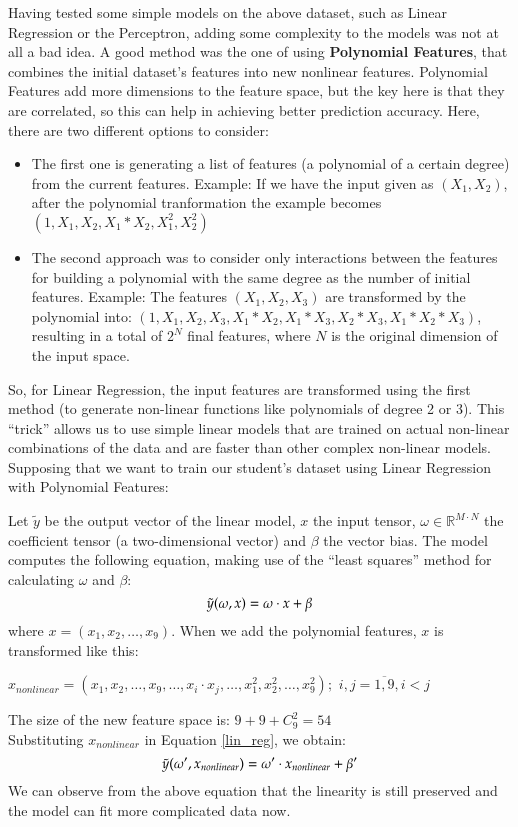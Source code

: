 Having tested some simple models on the above dataset, such as Linear Regression or the 
Perceptron, adding some complexity to the models was not at all a bad idea. 
A good method was the one of using {\bf Polynomial Features}, that combines the 
initial dataset's features into new nonlinear features. Polynomial Features add more 
dimensions to the feature space, but the key here is that they are correlated, 
so this can help in achieving better prediction accuracy. Here, there are two different 
options to consider:

\begin{itemize}
  \item The first one is generating a list of features (a polynomial of a certain 
  degree) from the current features. 
  Example: If we have the input given as $(X_1, X_2)$, after the polynomial 
  tranformation the example becomes $(1, X_1, X_2, X_1*X_2, X_1^2, X_2^2)$
  \item The second approach was to consider only interactions between the 
  features for building a polynomial with the same degree as the number of 
  initial features.
  Example: The features $(X_1, X_2, X_3)$ are transformed by the polynomial 
  into: $(1, X_1, X_2, X_3, X_1*X_2, X_1*X_3, X_2*X_3, X_1*X_2*X_3)$, resulting 
  in a total of $2^{N}$ final features, where $N$ is the original dimension of 
  the input space.
\end{itemize}

So, for Linear Regression, the input features are transformed using the first 
method (to generate non-linear functions like polynomials of degree 2 or 3).
This ``trick'' allows us to use simple linear models that are trained on actual 
non-linear combinations of the data and are faster than other complex 
non-linear models.
Supposing that we want to train our student's dataset using Linear Regression 
with Polynomial Features: 

Let $\tilde{y}$ be the output vector of the linear model, $x$ the input tensor,
$\omega \in \mathbb{R}^{M \cdot N}$ the coefficient tensor (a two-dimensional vector) 
and $\beta$ the vector bias. The model computes the following equation, making use of 
the ``least squares'' method for calculating 
$\omega$ and $\beta$:
\begin{equation}
\label{lin_reg}
\centering
\tilde{y}(\omega, x) = \omega \cdot x + \beta
\end{equation}
where $x = (x_1,x_2,\dots,x_{9}).$
When we add the polynomial features, $x$ is transformed like this:
\begin{center}
$x_{nonlinear} = (x_1,x_2,\dots,x_{9},\dots,x_i \cdot x_j,\dots,x_1^2,x_2^2,\dots,x_{9}^2);$ 
 $i, j = \overline{1,9}, i < j$
\end{center}
The size of the new feature space is: $9+9+C_{9}^2=54$ \\
Substituting $x_{nonlinear}$ in Equation \ref{lin_reg}, we obtain:
\begin{equation}
\centering
\tilde{y}(\omega', x_{nonlinear}) = \omega' \cdot x_{nonlinear} + \beta'
\end{equation}
We can observe from the above equation that the linearity is still preserved and the 
model can fit more complicated data now.

